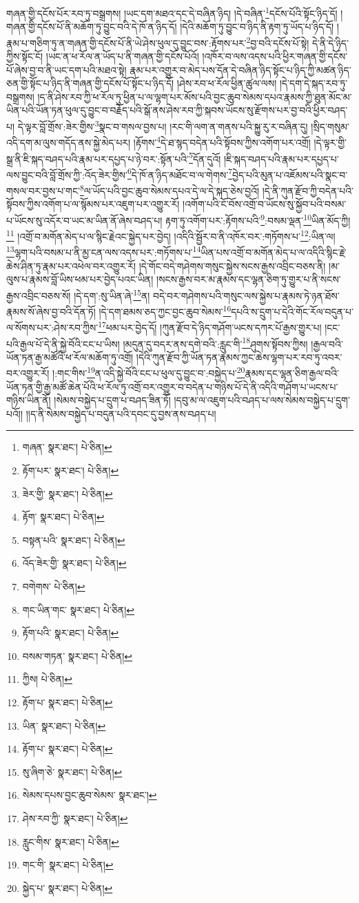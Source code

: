 གཞན་གྱི་དངོས་པོར་རབ་ཏུ་བསྒྲགས། །ཡང་དག་མཐའ་དང་དེ་བཞིན་ཉིད། །དེ་བཞིན་\footnote{གཞན་  སྣར་ཐང་།  པེ་ཅིན། }དངོས་པོའི་སྟོང་ཉིད་དོ། །གཞན་གྱི་དངོས་པོ་ནི་མཆོག་ཏུ་བྱུང་བའི་དེ་ཁོ་ན་ཉིད་དོ། །དེའི་མཆོག་ཏུ་བྱུང་བ་ཉིད་ནི་རྟག་ཏུ་ཡོད་པ་ཉིད་དོ། །རྣམ་པ་གཅིག་ཏུ་ན་གཞན་གྱི་དངོས་པོ་ནི་ཡེ་ཤེས་ཕུལ་དུ་བྱུང་བས་:རྟོགས་པར་\footnote{རྟོག་པར་  སྣར་ཐང་།  པེ་ཅིན། }བྱ་བའི་དངོས་པོ་སྟེ། དེ་ནི་དེ་ཉིད་ཀྱིས་སྟོང་ངོ། །ཡང་ན་ཕ་རོལ་ན་ཡོད་པ་ནི་གཞན་གྱི་དངོས་པོའོ། །འཁོར་བ་ལས་འདས་པའི་ཕྱིར་གཞན་གྱི་དངོས་པོ་ཞེས་བྱ་བ་ནི་ཡང་དག་པའི་མཐའ་སྟེ། རྣམ་པར་འགྱུར་བ་མེད་པས་དོན་དེ་བཞིན་ཉིད་སྟོང་པ་ཉིད་ཀྱི་མཚན་ཉིད་ཅན་གྱི་སྟོང་པ་ཉིད་ནི་གཞན་གྱི་དངོས་པོ་སྟོང་པ་ཉིད་དོ། །ཤེས་རབ་ཕ་རོལ་ཕྱིན་ཚུལ་ལས། །དེ་དག་དེ་སྐད་རབ་ཏུ་བསྒྲགས། །ད་ནི་ཤེས་རབ་ཀྱི་ཕ་རོལ་ཏུ་ཕྱིན་པ་ལ་ལྷག་པར་མོས་པའི་བྱང་ཆུབ་སེམས་དཔའ་རྣམས་ཀྱི་ཐུན་མོང་མ་ཡིན་པའི་ཡོན་ཏན་ཕུལ་དུ་བྱུང་བ་བརྗོད་པའི་སྒོ་ནས་ཤེས་རབ་ཀྱི་སྐབས་ཡོངས་སུ་རྫོགས་པར་བྱ་བའི་ཕྱིར་བཤད་པ། དེ་ལྟར་བློ་གྲོས་:ཟེར་གྱིས་\footnote{ཟེར་གྱི་  སྣར་ཐང་།  པེ་ཅིན། }སྣང་བ་གསལ་བྱས་པ། །རང་གི་ལག་ན་གནས་པའི་སྐྱུ་རུ་ར་བཞིན་དུ། །སྲིད་གསུམ་འདི་དག་མ་ལུས་གདོད་ནས་སྐྱེ་མེད་པར། །རྟོགས་\footnote{རྟོག་  སྣར་ཐང་།  པེ་ཅིན། }དེ་ཐ་སྙད་བདེན་པའི་སྟོབས་ཀྱིས་འགོག་པར་འགྲོ། །དེ་ལྟར་གྱི་སྒྲ་ནི་ཇི་སྐད་བཤད་པའི་རྣམ་པར་དཔྱད་པ་ཉེ་བར་:སྟོན་པའི་\footnote{བསྟན་པའི་  སྣར་ཐང་།  པེ་ཅིན། }དོན་དུའོ། །ཇི་སྐད་བཤད་པའི་རྣམ་པར་དཔྱད་པ་ལས་བྱུང་བའི་བློ་གྲོས་ཀྱི་:འོད་ཟེར་གྱིས་\footnote{འོད་ཟེར་གྱི་  སྣར་ཐང་།  པེ་ཅིན། }དེ་ཁོ་ན་ཉིད་མཐོང་བ་ལ་གེགས་\footnote{བགེགས་  པེ་ཅིན། }བྱེད་པའི་མུན་པ་འཇོམས་པའི་སྣང་བ་གསལ་བར་བྱས་པ་གང་\footnote{གང་ཡིན་གང་  སྣར་ཐང་།  པེ་ཅིན། }ལ་ཡོད་པའི་བྱང་ཆུབ་སེམས་དཔའ་དེ་ལ་དེ་སྐད་ཅེས་བྱའོ། །དེ་ནི་ཀུན་རྫོབ་ཀྱི་བདེན་པའི་སྟོབས་ཀྱིས་འགོག་པ་ལ་སྙོམས་པར་འཇུག་པར་འགྱུར་རོ། །འགོག་པའི་ངོ་བོས་འགྲོ་བ་ཡོངས་སུ་སྐྱོབ་པའི་བསམ་པ་ཡོངས་སུ་འདོར་བ་ཡང་མ་ཡིན་ནོ་ཞེས་བཤད་པ། རྟག་ཏུ་འགོག་པར་:རྟོགས་པའི་\footnote{རྟོག་པའི་  སྣར་ཐང་།  པེ་ཅིན། }:བསམ་ལྡན་\footnote{བསམ་གཏན་  སྣར་ཐང་།  པེ་ཅིན། }ཡིན་མོད་ཀྱི།\footnote{ཀྱིས།  པེ་ཅིན། } །འགྲོ་བ་མགོན་མེད་པ་ལ་སྙིང་རྗེའང་སྐྱེད་པར་བྱེད། །འདིའི་སྦྱོར་བ་ནི་འཁོར་བར་:གཏོགས་པ་\footnote{རྟོག་པ་  སྣར་ཐང་།  པེ་ཅིན། }:ཡིན་ལ། \footnote{ཡིན་  སྣར་ཐང་།  པེ་ཅིན། }ལྷག་པའི་བསམ་པ་ནི་མྱ་ངན་ལས་འདས་པར་:གཏོགས་པ་\footnote{རྟོག་པ་  སྣར་ཐང་།  པེ་ཅིན། }ཡིན་པས་འགྲོ་བ་མགོན་མེད་པ་ལ་འདིའི་སྙིང་རྗེ་ཆེས་ཤིན་ཏུ་རྣམ་པར་འཕེལ་བར་འགྱུར་རོ། །དེ་གོང་བདེ་གཤེགས་གསུང་སྐྱེས་སངས་རྒྱས་འབྲིང་བཅས་ནི། །མ་ལུས་པ་རྣམས་བློ་ཡིས་ཕམ་པར་བྱེད་པའང་ཡིན། །སངས་རྒྱས་བར་མ་རྣམས་དང་ལྷན་ཅིག་ཏུ་གྱུར་པ་ནི་སངས་རྒྱས་འབྲིང་བཅས་སོ། །དེ་དག་:སུ་ཡིན་ཞེ་\footnote{སུ་ཞིག་ཅེ་  སྣར་ཐང་།  པེ་ཅིན། }ན། བདེ་བར་གཤེགས་པའི་གསུང་ལས་སྐྱེས་པ་རྣམས་ཏེ་ཉན་ཐོས་རྣམས་སོ་ཞེས་བྱ་བའི་དོན་ཏོ། །དེ་དག་ཐམས་ཅད་ཀྱང་བྱང་ཆུབ་སེམས་\footnote{སེམས་དཔས་བྱང་ཆུབ་སེམས་  སྣར་ཐང་། }དཔའི་ས་དྲུག་པ་དེའི་གོང་རོལ་བདུན་པ་ལ་སོགས་པར་:ཤེས་རབ་ཀྱིས་\footnote{ཤེས་རབ་ཀྱི་  སྣར་ཐང་།  པེ་ཅིན། }ཕམ་པར་བྱེད་དོ། །ཀུན་རྫོབ་དེ་ཉིད་གཤོག་ཡངས་དཀར་པོ་རྒྱས་གྱུར་པ། །ངང་པའི་རྒྱལ་པོ་དེ་ནི་སྐྱེ་བོའི་ངང་པ་ཡིས། །མདུན་དུ་བདར་ནས་དགེ་བའི་:རླུང་གི་\footnote{རླུང་གིས་  སྣར་ཐང་།  པེ་ཅིན། }ཤུགས་སྟོབས་ཀྱིས། །རྒྱལ་བའི་ཡོན་ཏན་རྒྱ་མཚོའི་ཕ་རོལ་མཆོག་ཏུ་འགྲོ། །དེའི་ཀུན་རྫོབ་ཀྱི་ཡོན་ཏན་རྣམས་ཀྱང་ཆེས་ལྷག་པར་རབ་ཏུ་འབར་བར་འགྱུར་རོ། །:གང་གིས་\footnote{གང་གི་  སྣར་ཐང་།  པེ་ཅིན། }ན་འདི་སྐྱེ་བོའི་ངང་པ་ཕུལ་དུ་བྱུང་བ་:བསྐྱེད་པ་\footnote{སྐྱེད་པ་  སྣར་ཐང་།  པེ་ཅིན། }རྣམས་དང་ལྷན་ཅིག་རྒྱལ་བའི་ཡོན་ཏན་གྱི་རྒྱ་མཚོ་ཆེན་པོའི་ཕ་རོལ་ཏུ་འགྲོ་བར་འགྱུར་བ་བདེན་པ་གཉིས་པོ་དེ་ནི་འདིའི་གཤོག་པ་ཡངས་པ་གཉིས་ཡིན་ནོ། །སེམས་བསྐྱེད་པ་དྲུག་པ་བཤད་ཟིན་ཏོ། །དབུ་མ་ལ་འཇུག་པའི་བཤད་པ་ལས་སེམས་བསྐྱེད་པ་དྲུག་པའོ།། །།ད་ནི་སེམས་བསྐྱེད་པ་བདུན་པའི་དབང་དུ་བྱས་ནས་བཤད་པ། 